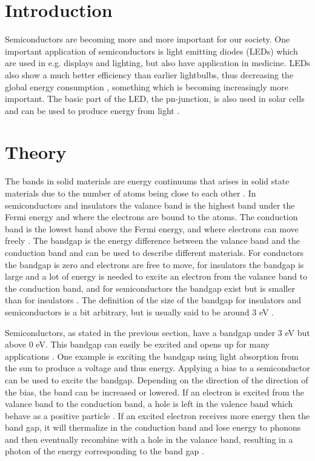 \section{Introduction}
Semiconductors are becoming more and more important for our society. One important application of semiconductors is light emitting diodes (LEDs) \cite{hofmann2015} which are used in e.g. displays and lighting, but also have application in medicine. LEDs also show a much better efficiency than earlier lightbulbs, thus decreasing the global energy consumption \cite{hofmann2015}, something which is becoming increasingly more important. The basic part of the LED, the pn-junction, is also used in solar cells and can be used to produce energy from light \cite{hofmann2015}.

\section{Theory}
The bands in solid materials are energy continuums that arises in solid state materials due to the number of atoms being close to each other \cite{hofmann2015}. In semiconductors and insulators the valance band is the highest band under the Fermi energy and where the electrons are bound to the atoms. The conduction band is the lowest band above the Fermi energy, and where electrons can move freely \cite{hofmann2015}. The bandgap is the energy difference between the valance band and the conduction band and can be used to describe different materials. For conductors the bandgap is zero and electrons are free to move, for insulators the bandgap is large and a lot of energy is needed to excite an electron from the valance band to the conduction band, and for semiconductors the bandgap exist but is smaller than for insulators \cite{hofmann2015}. The definition of the size of the bandgap for insulators and semiconductors is a bit arbitrary, but is usually said to be around 3 eV \cite{hofmann2015}.

Semiconductors, as stated in the previous section, have a bandgap under 3 eV but above 0 eV. This bandgap can easily be excited and opens up for many applications \cite{hofmann2015}. One example is exciting the bandgap using light absorption from the sun to produce a voltage and thus energy. Applying a bias to a semiconductor can be used to excite the bandgap. Depending on the direction of the direction of the bias, the band can be increased or lowered. If an electron is excited from the valance band to the conduction band, a hole is left in the valence band which behave as a positive particle \cite{hofmann2015}. If an excited electron receives more energy then the band gap, it will thermalize in the conduction band and lose energy to phonons and then eventually recombine with a hole in the valance band, resulting in a photon of the energy corresponding to the band gap \cite{hofmann2015}.


